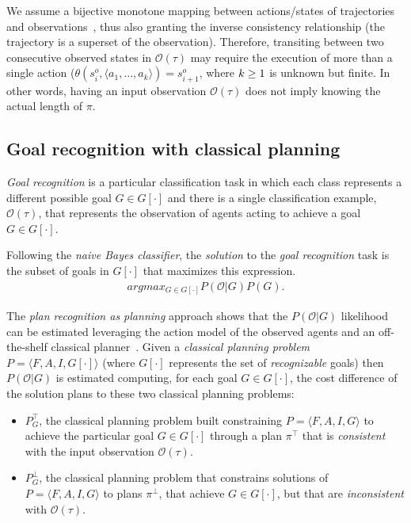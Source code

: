 \documentclass{article}
\newcommand{\tup}[1]{{\langle #1 \rangle}}
\begin{document}
We assume a bijective monotone mapping between actions/states of trajectories and observations~\cite{ramirez2009plan}, thus also granting the inverse consistency relationship (the trajectory is a superset of the observation). Therefore, transiting between two consecutive observed states in $\mathcal{O}(\tau)$ may require the execution of more than a single action ($\theta(s_i^o,\tup{a_1,\ldots,a_k})=s_{i+1}^o$, where ${\small k\geq 1}$ is unknown but finite. In other words, having an input observation $\mathcal{O}(\tau)$ does not imply knowing the actual length of $\pi$.

\subsection{Goal recognition with classical planning}
{\em Goal recognition} is a particular classification task in which each class represents a different possible goal $G\in G[\cdot]$ and there is a single classification example, $\mathcal{O}(\tau)$, that represents the observation of agents acting to achieve a goal $G\in G[\cdot]$.

Following the {\em naive Bayes classifier}, the {\em solution} to the {\em goal recognition} task is the subset of goals in $G[\cdot]$ that maximizes this expression.
\begin{align}
argmax_{G\in G[\cdot]} P(\mathcal{O}|G) P(G).
\end{align}

The {\em plan recognition as planning} approach shows that the $P(\mathcal{O}|G)$ likelihood can be estimated leveraging the action model of the observed agents and an off-the-shelf classical planner~\cite{ramirez2012plan}. Given a {\em classical planning problem} $P=\tup{F,A,I,G[\cdot]}$ (where $G[\cdot]$ represents the set of {\em recognizable} goals) then $P(\mathcal{O}|G)$ is estimated computing, for each goal $G\in G[\cdot]$, the cost difference of the solution plans to these two classical planning problems:
\begin{itemize}
\item $P^{\top}_G$, the classical planning problem built constraining $P=\tup{F,A,I,G}$ to achieve the particular goal $G\in G[\cdot]$ through a plan $\pi^\top$ that is {\em consistent} with the input observation $\mathcal{O}(\tau)$.
\item $P^{\bot}_G$, the classical planning problem that constrains solutions of $P=\tup{F,A,I,G}$ to plans $\pi^\bot$, that achieve $G\in G[\cdot]$, but that are {\em inconsistent} with $\mathcal{O}(\tau)$.
\end{itemize}
\end{document}
